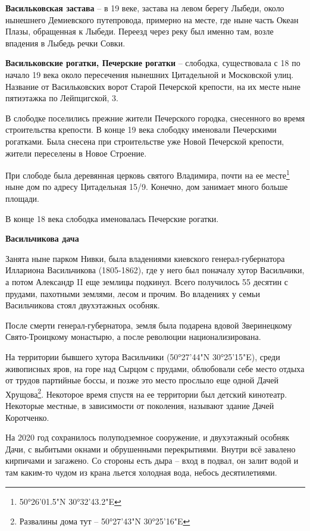 \textbf{Васильковская застава} – в 19 веке, застава на левом берегу Лыбеди, около нынешнего Демиевского путепровода, примерно на месте, где ныне часть Океан Плазы, обращенная к Лыбеди. Переезд через реку был именно там, возле впадения в Лыбедь речки Совки.\\

\medskip

\textbf{Васильковские рогатки, Печерские рогатки} – слободка, существовала с 18 по начало 19 века около пересечения нынешних Цитадельной и Московской улиц. Название от Васильковских ворот Старой Печерской крепости, на их месте ныне пятиэтажка по Лейпцигской, 3. 

В слободке поселились прежние жители Печерского городка, снесенного во время строительства крепости. В конце 19 века слободку именовали Печерскими рогатками. Была снесена при строительстве уже Новой Печерской крепости, жители переселены в Новое Строение.

При слободе была деревянная церковь святого Владимира, почти на ее месте\footnote{50°26'01.5"N 30°32'43.2"E} ныне дом по адресу Цитадельная 15/9. Конечно, дом занимает много больше площади.

В конце 18 века слободка именовалась Печерские рогатки.
\\

\medskip

\textbf{Васильчикова дача}

Занята ныне парком Нивки, была владениями киевского генерал-губернатора Иллариона Васильчикова (1805-1862), где у него был поначалу хутор Васильчики, а потом Александр II еще землицы подкинул. Всего получилось 55 десятин с прудами, пахотными землями, лесом и прочим. Во владениях у семьи Васильчикова стоял двухэтажных особняк.
 
После смерти генерал-губернатора, земля была подарена вдовой Зверинецкому Свято-Троицкому монастырю, а после революции национализирована. 

На территории бывшего хутора Васильчики (50°27'44"N 30°25'15"E), среди живописных яров, на горе над Сырцом с прудами, облюбовали себе место отдыха от трудов партийные боссы, и позже это место прослыло еще одной Дачей Хрущова\footnote{Развалины дома тут – 50°27'43"N 30°25'16"E}. Некоторое время спустя на ее территории был детский кинотеатр. Некоторые местные, в зависимости от поколения, называют здание Дачей Коротченко.

На 2020 год сохранилось полуподземное сооружение, и двухэтажный особняк Дачи, с выбитыми окнами и обрушенными перекрытиями. Внутри всё завалено кирпичами и загажено. Со стороны есть дыра – вход в подвал, он залит водой и там каким-то чудом из крана льется холодная вода, небось десятилетиями.

